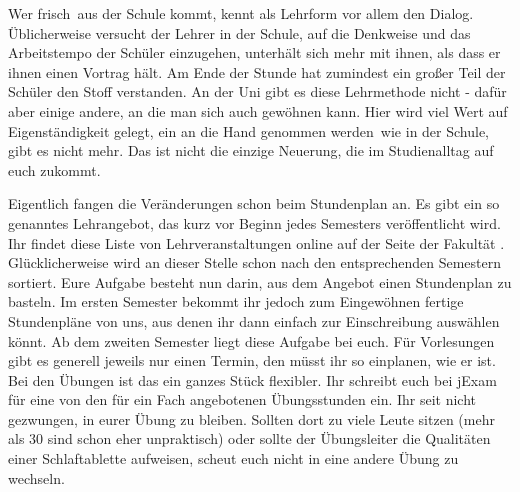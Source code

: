 

Wer \glqq frisch\grqq\ aus der Schule kommt, kennt als Lehrform vor allem den Dialog.
Üblicherweise versucht der Lehrer in der Schule, auf die Denkweise und das Arbeitstempo der Schüler einzugehen, unterhält sich mehr mit ihnen, als dass er ihnen einen Vortrag hält.
Am Ende der Stunde hat zumindest ein großer Teil der Schüler den Stoff verstanden.
An der Uni gibt es diese Lehrmethode nicht - dafür aber einige andere, an die man sich auch gewöhnen kann.
Hier wird viel Wert auf Eigenständigkeit gelegt, ein \glqq an die Hand genommen werden\grqq\ wie in der Schule, gibt es nicht mehr.
Das ist nicht die einzige Neuerung, die im Studienalltag auf euch zukommt.


Eigentlich fangen die Veränderungen schon beim Stundenplan an.
Es gibt ein so genanntes Lehrangebot, das kurz vor Beginn jedes Semesters veröffentlicht wird.
Ihr findet diese Liste von Lehrveranstaltungen online auf der Seite der Fakultät \link.
Glücklicherweise wird an dieser Stelle schon nach den entsprechenden Semestern sortiert.
Eure Aufgabe besteht nun darin, aus dem Angebot einen Stundenplan zu basteln.
Im ersten Semester bekommt ihr jedoch zum Eingewöhnen fertige Stundenpläne von uns, aus denen ihr dann einfach zur Einschreibung auswählen könnt.
Ab dem zweiten Semester liegt diese Aufgabe bei euch.
Für Vorlesungen gibt es generell jeweils nur einen Termin, den müsst ihr so einplanen, wie er ist.
Bei den Übungen ist das ein ganzes Stück flexibler.
Ihr schreibt euch bei jExam \link für eine von den für ein Fach angebotenen Übungsstunden ein.
Ihr seit nicht gezwungen, in eurer Übung zu bleiben.
Sollten dort zu viele Leute sitzen (mehr als 30 sind schon eher unpraktisch) oder sollte der Übungsleiter die Qualitäten einer Schlaftablette aufweisen, scheut euch nicht in eine andere Übung zu wechseln.


